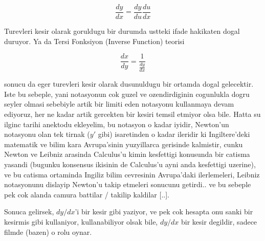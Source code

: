 \documentclass[12pt,fleqn]{article}
\begin{document}
\[ \frac{dy}{dx} = \frac{dy}{du}\frac{du}{dx} \]

Turevleri kesir olarak goruldugu bir durumda ustteki ifade hakikaten dogal
duruyor. Ya da Tersi Fonksiyon (Inverse Function) teorisi

\[ \frac{dx}{dy} = \frac{1}{\frac{dy}{dx}} \]

sonucu da eger turevleri kesir olarak dusunuldugu bir ortamda dogal
gelecektir. Iste bu sebeple, yani notasyonun cok guzel ve ozendirdiginin
cogunlukla dogru seyler olmasi sebebiyle artik bir limiti eden notasyonu
kullanmaya devam ediyoruz, her ne kadar artik gercekten bir kesiri temsil
etmiyor olsa bile. Hatta su ilginc tarihi anektodu ekleyelim, bu notasyon o
kadar iyidir, Newton'un notasyonu olan tek tirnak ($y'$ gibi) isaretinden o
kadar ileridir ki Ingiltere'deki matematik ve bilim kara Avrupa'sinin
yuzyillarca gerisinde kalmistir, cunku Newton ve Leibniz arasinda
Calculus'u kimin kesfettigi konusunda bir catisma yasandi (bugunku
konsensus ikisinin de Calculus'u ayni anda kesfettigi uzerine), ve bu
catisma ortaminda Ingiliz bilim cevresinin Avrupa'daki ilerlemeleri,
Leibniz notasyonunu dislayip Newton'u takip etmeleri sonucunu getirdi.. ve
bu sebeple pek cok alanda camura battilar / takilip kaldilar [..].

Sonuca gelirsek, $dy/dx$'i bir kesir gibi yaziyor, ve pek cok hesapta onu
sanki bir kesirmis gibi kullaniyor, kullanabiliyor olsak bile, $dy/dx$ bir
kesir degildir, sadece filmde (bazen) o rolu oynar. 
\end{document}
